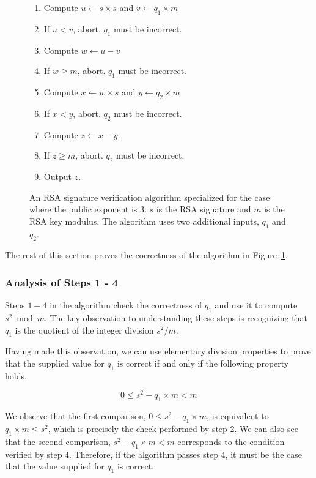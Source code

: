 \begin{figure}[hbt]
  \centering
  \begin{enumerate}
    \item Compute $u \leftarrow s \times s$ and $v \leftarrow q_1 \times m$
    \item If $u < v$, abort. $q_1$ must be incorrect.
    \item Compute $w \leftarrow u - v$
    \item If $w \ge m$, abort. $q_1$ must be incorrect.
    \item Compute $x \leftarrow w \times s$ and $y \leftarrow q_2 \times m$
    \item If $x < y$, abort. $q_2$ must be incorrect.
    \item Compute $z \leftarrow x - y$.
    \item If $z \ge m$, abort. $q_2$ must be incorrect.
    \item Output $z$.
  \end{enumerate}
  \caption{
    An RSA signature verification algorithm specialized for the case where
    the public exponent is 3. $s$ is the RSA signature and $m$ is the RSA key
    modulus. The algorithm uses two additional inputs, $q_1$ and $q_2$.
  }
  \label{fig:sgx_sig_verification}
\end{figure}

The rest of this section proves the correctness of the algorithm in
Figure~\ref{fig:sgx_sig_verification}.


\subsubsection{Analysis of Steps 1 - 4}

Steps $1 - 4$ in the algorithm check the correctness of $q_1$ and use it
to compute $s^2 \bmod m$. The key observation to understanding these steps is
recognizing that $q_1$ is the quotient of the integer division $s^2 / m$.

Having made this observation, we can use elementary division properties to
prove that the supplied value for $q_1$ is correct if and only if the following
property holds.

$$ 0 \le s^2 - q_1 \times m < m $$

We observe that the first comparison, $0 \le s^2 - q_1 \times m$, is equivalent
to $q_1 \times m \le s^2$, which is precisely the check performed by step 2. We
can also see that the second comparison, $s^2 - q_1 \times m < m$ corresponds
to the condition verified by step 4. Therefore, if the algorithm passes step 4,
it must be the case that the value supplied for $q_1$ is correct.

